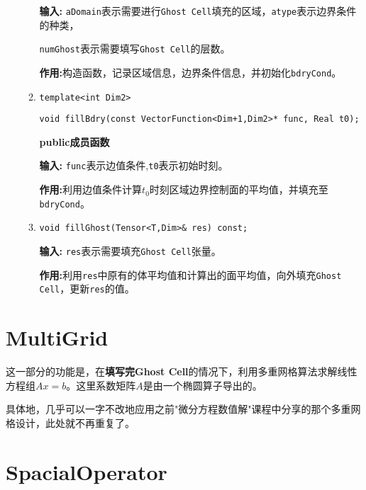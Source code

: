\documentclass[UTF8]{ctexart}
\theoremstyle{plain}
\theoremstyle{definition}
\theoremstyle{remark}
\begin{document}
\begin{itemize}
\begin{enumerate}
        \textbf{输入:} \texttt{aDomain}表示需要进行\texttt{Ghost Cell}填充的区域，\texttt{atype}表示边界条件的种类， 
        
        \texttt{numGhost}表示需要填写\texttt{Ghost Cell}的层数。

        \textbf{作用:}构造函数，记录区域信息，边界条件信息，并初始化\texttt{bdryCond}。

        \item 
        \texttt{template<int Dim2>}

        \texttt{void fillBdry(const VectorFunction<Dim+1,Dim2>* func, Real t0);}
        
        \textbf{public成员函数}

        \textbf{输入:} \texttt{func}表示边值条件,\texttt{t0}表示初始时刻。

        \textbf{作用:}利用边值条件计算$t_{0}$时刻区域边界控制面的平均值，并填充至\texttt{bdryCond}。

        \item \texttt{void fillGhost(Tensor<T,Dim>\& res) const;}
        
        \textbf{输入:} \texttt{res}表示需要填充\texttt{Ghost Cell}张量。

        \textbf{作用:}利用\texttt{res}中原有的体平均值和计算出的面平均值，向外填充\texttt{Ghost Cell}，更新\texttt{res}的值。
    \end{enumerate}
\end{itemize}
\section{MultiGrid}
这一部分的功能是，在\textbf{填写完Ghost Cell}的情况下，利用多重网格算法求解线性方程组$Ax=b$。这里系数矩阵$A$是由一个椭圆算子导出的。

具体地，几乎可以一字不改地应用之前"微分方程数值解"课程中分享的那个多重网格设计，此处就不再重复了。
\section{SpacialOperator}
\end{document}
